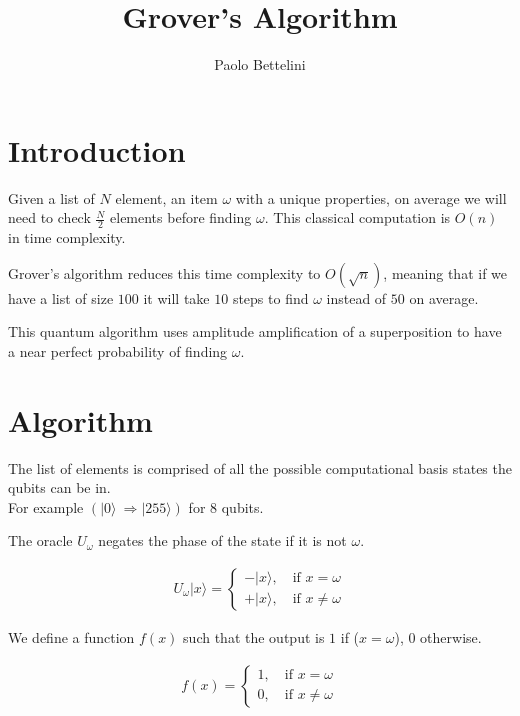 \documentclass{article}
\title{Grover's Algorithm}
\author{Paolo Bettelini}
\date{}
\begin{document}
\maketitle
\tableofcontents
\pagebreak

\section{Introduction}

Given a list of \(N\) element, an item \(\omega\) with a unique properties, on average we will need to check \(\frac{N}{2}\) elements before finding \(\omega\).
This classical computation is \(O(n)\) in time complexity.

Grover's algorithm reduces this time complexity to \(O(\sqrt{n})\), meaning that if we have a list of size \(100\) it will take \(10\) steps to find \(\omega\) instead of \(50\) on average.

This quantum algorithm uses amplitude amplification of a superposition to have a near perfect probability of finding \(\omega\).

\pagebreak

\section{Algorithm}

The list of elements is comprised of all the possible computational basis states the qubits can be in.\\
For example \((|0\rangle\ \Rightarrow |255\rangle)\) for 8 qubits.

The oracle \(U_\omega\) negates the phase of the state if it is not \(\omega\).

\begin{align*}
    U_\omega|x\rangle=
    \begin{cases}
        -|x\rangle,\quad \text{if } x=\omega \\
        +|x\rangle,\quad \text{if } x\neq\omega
    \end{cases}
\end{align*}

We define a function \(f(x)\) such that the output is \(1\) if (\(x=\omega\)), \(0\) otherwise.

\begin{align*}
    f(x)=
    \begin{cases}
        1,\quad \text{if } x=\omega \\
        0,\quad \text{if } x\neq\omega
    \end{cases}
\end{align*}
\end{document}
